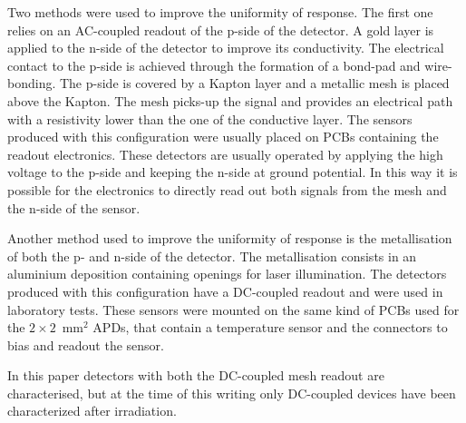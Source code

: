 \documentclass{article}
\begin{document}
Two methods were used to improve the uniformity of response.
The first one relies on an AC-coupled readout of the p-side of the detector.
A gold layer is applied to the n-side of the detector to improve its conductivity.
The electrical contact to the p-side is achieved through the formation of a bond-pad and wire-bonding.
The p-side is covered by a Kapton layer and a metallic mesh is placed above the Kapton.
The mesh picks-up the signal and provides an electrical path with a resistivity lower than the one of the conductive layer.
The sensors produced with this configuration were usually placed on PCBs containing the readout electronics.
These detectors are usually operated by applying the high voltage to the p-side and keeping the n-side at ground potential.
In this way it is possible for the electronics to directly read out both signals from the mesh and the n-side of the sensor.

Another method used to improve the uniformity of response is the metallisation of both the p- and n-side of the detector.
The metallisation consists in an aluminium deposition containing openings for laser illumination.
The detectors produced with this configuration have a DC-coupled readout and were used in laboratory tests.
These sensors were mounted on the same kind of PCBs used for the $2 \times 2$~mm$^2$ APDs, that contain a temperature sensor and the connectors to bias and readout the sensor.

In this paper detectors with both the DC-coupled mesh readout are characterised, but at the time of this writing only DC-coupled devices have been characterized after irradiation. 


\end{document}
